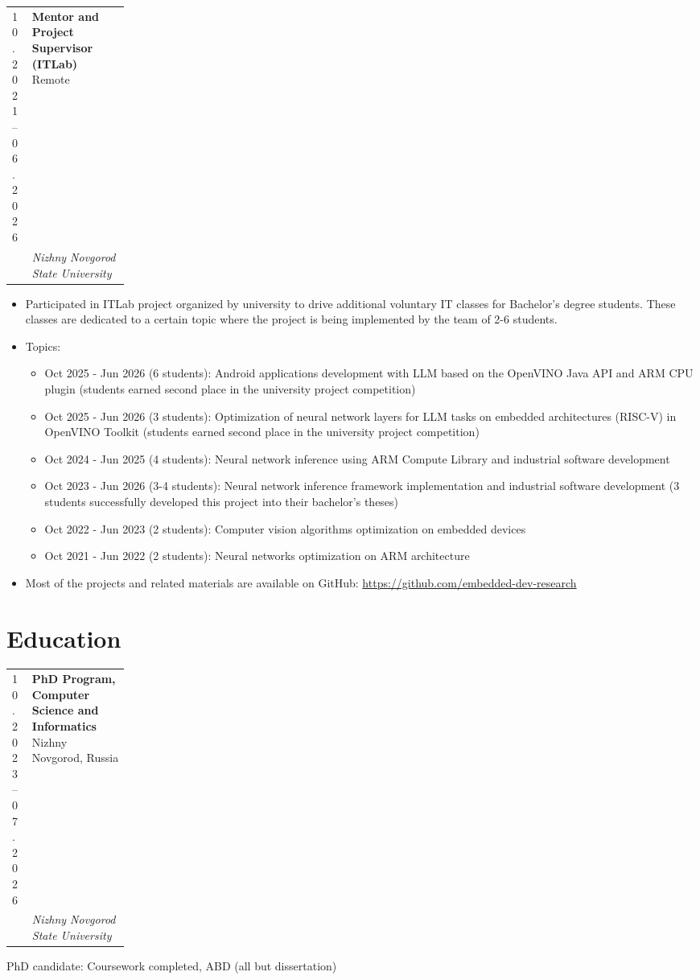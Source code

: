 \documentclass[11pt,a4paper]{article}
\makeatletter
\newcommand{\muted}[1]{{\color{Muted}#1}}
\newcommand{\cventry}[5]{%
  \par\noindent
  \begin{tabularx}{\linewidth}{@{}p{0.17\linewidth}@{\hspace{0.55em}}X@{}}
    \muted{\small #1} &
    {\textbf{#3} \hfill \muted{\small #4}}\\[-0.15em]
    & {\textit{#2}}\\
  \end{tabularx}\par
  #5
  \vspace{0.25em}
}
\newcommand{\cvbullets}[1]{%
  \begin{itemize}[leftmargin=1.4em, labelsep=0.5em]
    #1
  \end{itemize}
}
\newcommand{\cvplain}[1]{%
  \vspace{0.1em}
  \small #1
  \par
}
\makeatother
\begin{document}
\cventry
  {10.2021 -- 06.2026}
  {Nizhny Novgorod State University}
  {Mentor and Project Supervisor (ITLab)}
  {Remote}
  {\cvbullets{
    \item Participated in ITLab project organized by university to drive additional voluntary IT classes for Bachelor's degree students. These classes are dedicated to a certain topic where the project is being implemented by the team of 2-6 students.
    \item Topics:
      \begin{itemize}
        \item Oct 2025 - Jun 2026 (6 students): Android applications development with LLM based on the OpenVINO Java API and ARM CPU plugin (students earned second place in the university project competition)
        \item Oct 2025 - Jun 2026 (3 students): Optimization of neural network layers for LLM tasks on embedded architectures (RISC-V) in OpenVINO Toolkit (students earned second place in the university project competition)
        \item Oct 2024 - Jun 2025 (4 students): Neural network inference using ARM Compute Library and industrial software development
        \item Oct 2023 - Jun 2026 (3-4 students): Neural network inference framework implementation and industrial software development (3 students successfully developed this project into their bachelor's theses)
        \item Oct 2022 - Jun 2023 (2 students): Computer vision algorithms optimization on embedded devices
        \item Oct 2021 - Jun 2022 (2 students): Neural networks optimization on ARM architecture
      \end{itemize}
    \item Most of the projects and related materials are available on GitHub: \href{https://github.com/embedded-dev-research}{https://github.com/embedded-dev-research}
  }}

\section*{Education}

\cventry
  {10.2023 -- 07.2026}
  {Nizhny Novgorod State University}
  {PhD Program, Computer Science and Informatics}
  {Nizhny Novgorod, Russia}
  {\cvplain{PhD candidate: Coursework completed, ABD (all but dissertation)}}
\end{document}
